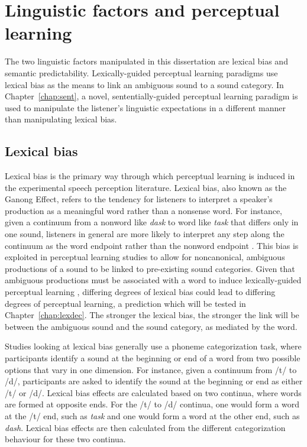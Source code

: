 \section{Linguistic factors and perceptual learning}
\label{sec:linguistic}

The two linguistic factors manipulated in this dissertation are lexical bias and semantic predictability.  
Lexically-guided perceptual learning paradigms use lexical bias as the means to link an ambiguous sound to a sound category.
In Chapter~\ref{chap:sent}, a novel, sententially-guided perceptual learning paradigm is used to manipulate the listener's linguistic expectations in a different manner than manipulating lexical bias.

\subsection{Lexical bias}
\label{sec:lexicalbias}

Lexical bias is the primary way through which perceptual learning is induced in the experimental speech perception literature.
Lexical bias, also known as the Ganong Effect, refers to the tendency for listeners to interpret a speaker's production as a meaningful word rather than a nonsense word.  
For instance, given a continuum from a nonword like \emph{dask} to word like \emph{task} that differs only in one sound, listeners in general are more likely to interpret any step along the continuum as the word endpoint rather than the nonword endpoint \citep{Ganong1980}. 
This bias is exploited in perceptual learning studies to allow for noncanonical, ambiguous productions of a sound to be linked to pre-existing sound categories.
Given that ambiguous productions must be associated with a word to induce lexically-guided perceptual learning \citep{Norris2003}, differing degrees of lexical bias could lead to differing degrees of perceptual learning, a prediction which will be tested in Chapter~\ref{chap:lexdec}.  
The stronger the lexical bias, the stronger the link will be between the ambiguous sound and the sound category, as mediated by the word.

Studies looking at lexical bias generally use a phoneme categorization task, where participants identify a sound at the beginning or end of a word from two possible options that vary in one dimension.  
For instance, given a continuum from /t/ to /d/, participants are asked to identify the sound at the beginning or end as either /t/ or /d/. 
Lexical bias effects are calculated based on two continua, where words are formed at opposite ends. 
For the /t/ to /d/ continua, one would form a word at the /t/ end, such as \emph{task} and one would form a word at the other end, such as \emph{dash}.  
Lexical bias effects are then calculated from the different categorization behaviour for these two continua.

